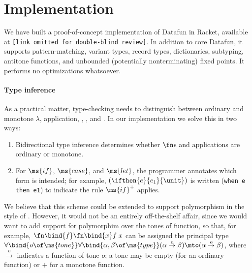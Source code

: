 \section{Implementation}
We have built a proof-of-concept implementation of Datafun in Racket, available
at \texttt{[link omitted for double-blind review]}. In addition to core Datafun,
it supports pattern-matching, variant types, record types, dictionaries,
subtyping, antitone functions, and unbounded (potentially nonterminating) fixed
points. It performs no optimizations whatsoever.

\paragraph{Type inference}
As a practical matter, type-checking needs to distinguish between ordinary and
monotone $\lambda$, application, , , and . In our
implementation we solve this in two ways:
\begin{enumerate}
\item Bidirectional type inference\cite{bidirectional} determines whether $\fn$s and
  applications are ordinary or monotone.
\item For $\ms{if}$, $\ms{case}$, and $\ms{let}$, the programmer annotates which
  form is intended; for example, $(\ifthen{e}{e_1}{\unit})$ is written
  (\texttt{when e then e1}) to indicate the rule $\ms{if}^+$ applies.
\end{enumerate}

We believe that this scheme could be extended to support polymorphism
in the style of \citet{dunfield-bidir}. However, it would not be an
entirely off-the-shelf affair, since we would want to add support for
polymorphim over the tones of function, so that, for example,
$\fn\bind{f}\fn\bind{x} f\;x$ can be assigned the principal type
$\forall\bind{o\of\ms{tone}}\forall\bind{\alpha,\beta \of \ms{type}}
(\alpha \overset{o}\to \beta) \mto (\alpha \overset{o}\to \beta)$,
where $\overset{o}\to$ indicates a function of tone $o$; a tone may be
empty (for an ordinary function) or ${+}$ for a monotone function.

% 
% 

